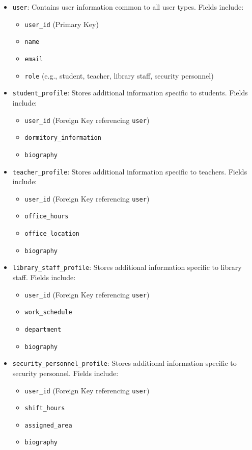 \documentclass[12pt]{article}
\begin{document}
\begin{itemize}
    \item \texttt{user}: Contains user information common to all user types. Fields include:
    \begin{itemize}
        \item \texttt{user\_id} (Primary Key)
        \item \texttt{name}
        \item \texttt{email}
        \item \texttt{role} (e.g., student, teacher, library staff, security personnel)
    \end{itemize}
    
    \item \texttt{student\_profile}: Stores additional information specific to students. Fields include:
    \begin{itemize}
        \item \texttt{user\_id} (Foreign Key referencing \texttt{user})
        \item \texttt{dormitory\_information}
        \item \texttt{biography}
    \end{itemize}
    
    \item \texttt{teacher\_profile}: Stores additional information specific to teachers. Fields include:
    \begin{itemize}
        \item \texttt{user\_id} (Foreign Key referencing \texttt{user})
        \item \texttt{office\_hours}
        \item \texttt{office\_location}
        \item \texttt{biography}
    \end{itemize}
    
    \item \texttt{library\_staff\_profile}: Stores additional information specific to library staff. Fields include:
    \begin{itemize}
        \item \texttt{user\_id} (Foreign Key referencing \texttt{user})
        \item \texttt{work\_schedule}
        \item \texttt{department}
        \item \texttt{biography}
    \end{itemize}

    \item \texttt{security\_personnel\_profile}: Stores additional information specific to security personnel. Fields include:
    \begin{itemize}
        \item \texttt{user\_id} (Foreign Key referencing \texttt{user})
        \item \texttt{shift\_hours}
        \item \texttt{assigned\_area}
        \item \texttt{biography}
    \end{itemize}
    

\end{itemize}
\end{document}
